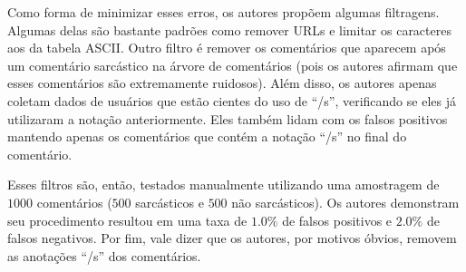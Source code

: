Como forma de minimizar esses erros, os autores propõem algumas filtragens.
Algumas delas são bastante padrões como remover URLs e limitar os caracteres aos
da tabela ASCII. Outro filtro é remover os comentários que aparecem após um
comentário sarcástico na árvore de comentários (pois os autores afirmam que
esses comentários são extremamente ruidosos). Além disso, os autores apenas
coletam dados de usuários que estão cientes do uso de ``/s'', verificando se
eles já utilizaram a notação anteriormente. Eles também lidam com os falsos
positivos mantendo apenas os comentários que contém a notação ``/s'' no final do
comentário.

Esses filtros são, então, testados manualmente utilizando uma amostragem de
$1000$ comentários ($500$ sarcásticos e $500$ não sarcásticos). Os autores
demonstram seu procedimento resultou em uma taxa de $1.0\%$ de falsos positivos
e $2.0\%$ de falsos negativos. Por fim, vale dizer que os autores, por motivos
óbvios, removem as anotações ``/s'' dos comentários.

